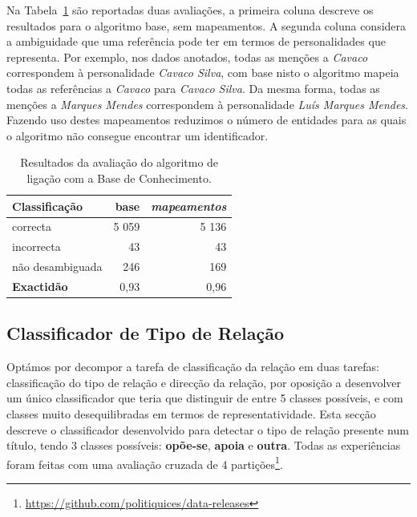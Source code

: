\documentclass[a4paper, twocolumn, 11pt, twoside]{article}
\begin{document}
Na Tabela~\ref{tab:ent_linking_results} são reportadas duas avaliações, a primeira coluna descreve os resultados para o algoritmo base, sem mapeamentos. A segunda coluna considera a ambiguidade que uma referência pode ter em termos de personalidades que representa. Por exemplo, nos dados anotados, todas as menções a \textit{Cavaco} correspondem à personalidade \textit{Cavaco Silva}, com base nisto o algoritmo mapeia todas as referências a \textit{Cavaco} para \textit{Cavaco Silva}. Da mesma forma, todas as menções a \textit{Marques Mendes} correspondem à personalidade \textit{Luís Marques Mendes}. Fazendo uso destes mapeamentos reduzimos o número de entidades para as quais o algoritmo não consegue encontrar um identificador.

\begin{table}[!h]
    \begin{center}
    \begin{tabular}{l rr}
        {\bf Classificação} & {\bf base} & \it{{\bf mapeamentos}} \\
        \hline
        correcta            &   5 059    &  5 136   \\
        incorrecta          &      43    &     43   \\
		não desambiguada    &     246    &    169   \\    
        \hline
		{\bf Exactidão }    &    0,93	 &  0,96   \\
    \end{tabular}
	\caption{Resultados da avaliação do algoritmo de ligação com a Base de Conhecimento.}
	\label{tab:ent_linking_results}
	\end{center}
\end{table}

\subsection{Classificador de Tipo de Relação}
\label{subsec:rel_classifier}

Optámos por decompor a tarefa de classificação da relação em duas tarefas: classificação do tipo de relação e direcção da relação, por oposição a desenvolver um único classificador que teria que distinguir de entre 5 classes possíveis, e com classes muito desequilibradas em termos de representatividade. Esta secção descreve o classificador desenvolvido para detectar o tipo de relação presente num título, tendo 3 classes possíveis: \textbf{opõe-se}, \textbf{apoia} e \textbf{outra}. Todas as experiências foram feitas com uma avaliação cruzada de 4 partições\footnote{\url{https://github.com/politiquices/data-releases}}.
\end{document}
